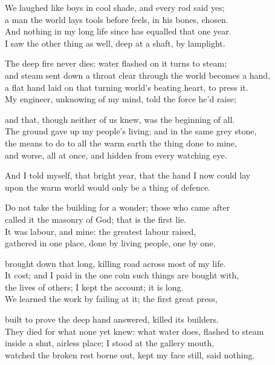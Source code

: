 \begin{founder}
We laughed like boys in cool shade, and every rod said yes;\\
a man the world lays tools before feels, in his bones, chosen.\\
And nothing in my long life since has equalled that one year.\\
I saw the other thing as well, deep at a shaft, by lamplight.\\
\medskip

The deep fire never dies; water flashed on it turns to steam;\\
and steam sent down a throat clear through the world becomes a hand,\\
a flat hand laid on that turning world's beating heart, to press it.\\
My engineer, unknowing of my mind, told the force he'd raise;\\
\medskip

and that, though neither of us knew, was the beginning of all.\\
The ground gave up my people's living; and in the same grey stone,\\
the means to do to all the warm earth the thing done to mine,\\
and worse, all at once, and hidden from every watching eye.\\
\medskip

And I told myself, that bright year, that the hand I now could lay\\
upon the warm world would only be a thing of defence.
\medskip

Do not take the building for a wonder; those who came after\\
called it the masonry of God; that is the first lie.\\
It was labour, and mine: the greatest labour raised,\\
gathered in one place, done by living people, one by one,\\
\medskip

brought down that long, killing road across most of my life.\\
It cost; and I paid in the one coin such things are bought with,\\
the lives of others; I kept the account; it is long.\\
We learned the work by failing at it; the first great press,\\
\medskip

built to prove the deep hand answered, killed its builders.\\
They died for what none yet knew: what water does, flashed to steam\\
inside a shut, airless place; I stood at the gallery mouth,\\
watched the broken rest borne out, kept my face still, said nothing.\\
\medskip


\end{founder}
